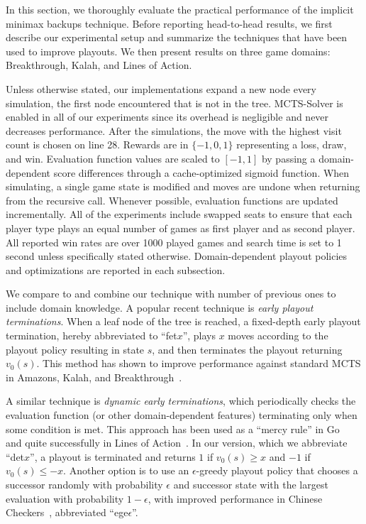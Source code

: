 \documentclass{article}
\begin{document}
In this section, we thoroughly evaluate the practical performance of the implicit minimax backups technique. 
Before reporting head-to-head results, we first describe our experimental setup and 
summarize the techniques that have been used to improve playouts. We then present results on three game
domains: Breakthrough, Kalah, and Lines of Action. 

Unless otherwise stated, our implementations expand a new node every simulation, the first node encountered
that is not in the tree. MCTS-Solver is enabled in all of our experiments since its overhead is negligible and
never decreases performance. After the simulations, the move with the highest visit count 
is chosen on line 28. 
Rewards are in $\{-1, 0, 1\}$ representing a loss, draw, and win.
Evaluation function values are scaled to $[-1,1]$ by passing a domain-dependent 
score differences through a cache-optimized sigmoid function. 
When simulating, a single game state is modified and 
moves are undone when returning from the recursive call.
Whenever possible, evaluation functions are updated incrementally. 
All of the experiments include swapped seats to ensure that each player type plays 
an equal number of games as first player and as second player.
All reported win rates are over 1000 played games and search time is set to 1 second unless specifically stated 
otherwise.
Domain-dependent playout policies and optimizations are reported in each subsection.

We compare to and combine our technique with number of previous ones to include  
domain knowledge. A popular recent technique is {\it early playout terminations}. When a leaf node of the tree 
is reached, a fixed-depth early playout termination, hereby abbreviated to ``fet$x$'', plays $x$ moves according
to the playout policy resulting in state $s$, and then terminates the playout returning $v_0(s)$. This method has
shown to improve performance against standard MCTS in Amazons, Kalah, and 
Breakthrough~\cite{Lorentz13Breakthrough,Ramanujan11Tradeoffs,Lorentz08Amazons}. 

A similar technique is {\it dynamic early terminations}, which periodically checks the evaluation function 
(or other domain-dependent features) terminating only when some condition is met. 
This approach has been used as a ``mercy rule'' in Go~\cite{Bouzy07Old} and quite successfully in 
Lines of Action~\cite{Winands08MCTSSolver}.
In our version, which we abbreviate ``det$x$'', a playout is terminated and returns $1$ if $v_0(s) \ge x$ and 
$-1$ if $v_0(s) \le -x$. Another option is to use an $\epsilon$-greedy playout policy that chooses a successor randomly 
with probability $\epsilon$ and successor state with the largest evaluation with probability $1-\epsilon$, with 
improved performance in Chinese Checkers~\cite{Sturtevant08An,Nijssen12Playout}, abbreviated ``ege$\epsilon$''.
\end{document}
